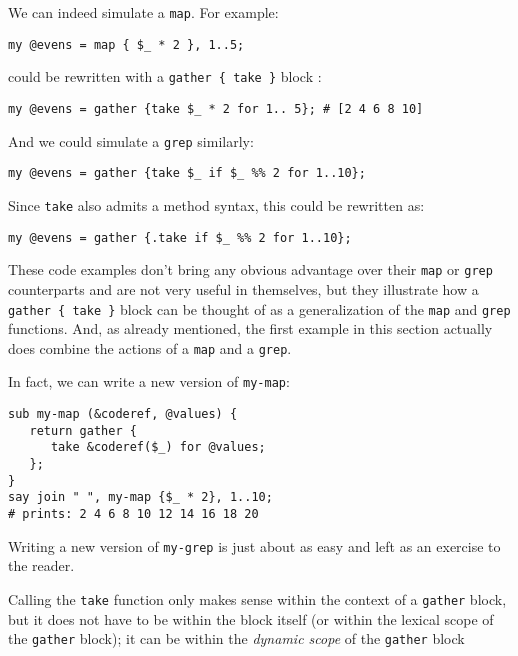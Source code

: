 We can indeed simulate a \verb'map'. For example:

\begin{verbatim}
my @evens = map { $_ * 2 }, 1..5;
\end{verbatim}

could be rewritten with a \verb'gather { take }' 
block :

\begin{verbatim}
my @evens = gather {take $_ * 2 for 1.. 5}; # [2 4 6 8 10]
\end{verbatim}

And we could simulate a {\tt grep} similarly:

\begin{verbatim}
my @evens = gather {take $_ if $_ %% 2 for 1..10};
\end{verbatim}

Since {\tt take} also admits a method syntax, this could 
be rewritten as:

\begin{verbatim}
my @evens = gather {.take if $_ %% 2 for 1..10};
\end{verbatim}

These code examples don't bring any obvious advantage 
over their \verb'map' or {\tt grep} counterparts and 
are not very useful in themselves, but they illustrate 
how a \verb'gather { take }' block can be thought 
of as a generalization of the \verb'map' and 
{\tt grep} functions. And, as already mentioned, 
the first example in this section actually does combine 
the actions of a {\tt map} and a {\tt grep}.

In fact, we can write a new version of {\tt my-map}:

\begin{verbatim}
sub my-map (&coderef, @values) {
   return gather {
      take &coderef($_) for @values;
   };
}
say join " ", my-map {$_ * 2}, 1..10;
# prints: 2 4 6 8 10 12 14 16 18 20
\end{verbatim}

Writing a new version of {\tt my-grep} is just 
about as easy and left as an exercise to the reader.

Calling the {\tt take} function only makes sense 
within the context of a \verb'gather' block, but 
it does not have to be within the block itself 
(or within the lexical scope of the \verb'gather' 
block); it can be within the \emph{dynamic scope} of the 
\verb'gather' block

